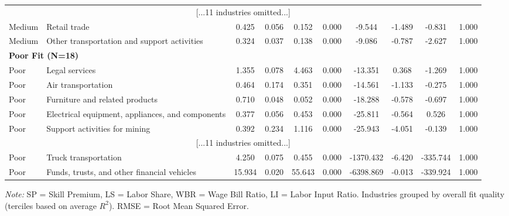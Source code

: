 \begin{landscape}
\begin{table}[H]
\begin{center}
\begin{tabular}{llcccc|cccc}
\multicolumn{10}{c}{[...11 industries omitted...]} \\
Medium & Retail trade & 0.425 & 0.056 & 0.152 & 0.000 & -9.544 & -1.489 & -0.831 & 1.000 \\
Medium & Other transportation and support activities & 0.324 & 0.037 & 0.138 & 0.000 & -9.086 & -0.787 & -2.627 & 1.000 \\
\midrule
\multicolumn{10}{l}{\textbf{Poor Fit (N=18)}} \\
Poor & Legal services & 1.355 & 0.078 & 4.463 & 0.000 & -13.351 & 0.368 & -1.269 & 1.000 \\
Poor & Air transportation & 0.464 & 0.174 & 0.351 & 0.000 & -14.561 & -1.133 & -0.275 & 1.000 \\
Poor & Furniture and related products & 0.710 & 0.048 & 0.052 & 0.000 & -18.288 & -0.578 & -0.697 & 1.000 \\
Poor & Electrical equipment, appliances, and components & 0.377 & 0.056 & 0.453 & 0.000 & -25.811 & -0.564 & 0.526 & 1.000 \\
Poor & Support activities for mining & 0.392 & 0.234 & 1.116 & 0.000 & -25.943 & -4.051 & -0.139 & 1.000 \\
\multicolumn{10}{c}{[...11 industries omitted...]} \\
Poor & Truck transportation & 4.250 & 0.075 & 0.455 & 0.000 & -1370.432 & -6.420 & -335.744 & 1.000 \\
Poor & Funds, trusts, and other financial vehicles & 15.934 & 0.020 & 55.643 & 0.000 & -6398.869 & -0.013 & -339.924 & 1.000 \\
\bottomrule
\end{tabular}
\end{center}
\begin{minipage}{\textwidth}
\small
\textit{Note:} SP = Skill Premium, LS = Labor Share, WBR = Wage Bill Ratio, LI = Labor Input Ratio. 
Industries grouped by overall fit quality (terciles based on average $R^2$). RMSE = Root Mean Squared Error.
\end{minipage}
\end{table}
\end{landscape}
